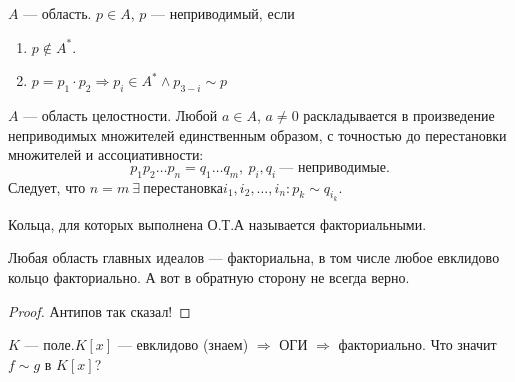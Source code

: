 \begin{definition}
    $A$ --- область.  $p \in A$,  $p$ --- неприводимый, если 
     \begin{enumerate}
         \item $p \not \in A^*$.
         \item  $p = p_1 \cdot p_2 \Rightarrow p_i \in A^* \land p_{3-i} \sim p$
    \end{enumerate}
\end{definition}
\begin{theorem}
    $A$ --- область целостности. Любой  $a \in A$,  $a \neq 0$ раскладывается в произведение неприводимых множителей единственным образом, с точностью до перестановки множителей и ассоциативности:  \[
        p_1p_2\ldots p_n = q_1 \ldots q_m,\ p_i, q_i\ \text{--- неприводимые}
    .\] Следует, что $n= m\ \exists\ \text{перестановка} i_1, i_2, \ldots, i_n\!: p_k \sim q_{i_k}$.
\end{theorem}
\begin{definition}
    Кольца, для которых выполнена О.Т.А называется факториальными. 
\end{definition}
\begin{theorem}
    Любая область главных идеалов --- факториальна, в том числе любое евклидово кольцо факториально. А вот в обратную сторону не всегда верно.
\end{theorem}
\begin{proof}
    Антипов так сказал!
\end{proof}
\slashn
$K$ --- поле.$K[x]$ --- евклидово (знаем) $\Rightarrow$ ОГИ  $\Rightarrow$ факториально. Что значит  $f \sim g$ в  $K[x]$?

